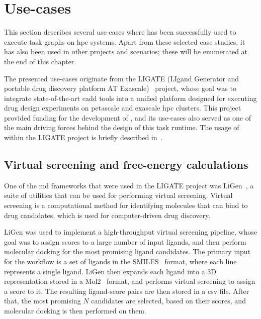 
\section{Use-cases}
This section describes several use-cases where \hyperqueue{} has been successfully used
to execute task graphs on \gls{hpc} systems. Apart from these selected case studies,
it has also been used in other projects and scenarios; these will be enumerated at the end of this
chapter.

The presented use-cases originate from the LIGATE (LIgand Generator and portable drug discovery
platform AT Exascale)~\cite{ligate} project, whose goal was to integrate state-of-the-art
\gls{cadd} tools into a unified platform designed for executing drug design
experiments on petascale and exascale \gls{hpc} clusters. This project provided
funding for the development of \hyperqueue{}, and its use-cases also served as one of the
main driving forces behind the design of this task runtime. The usage of \hyperqueue{}
within the LIGATE project is briefly described in~\cite{ligate}.

\subsection{Virtual screening and free-energy calculations}
\label{sec:hq-usecase-ligen}
One of the \gls{md} frameworks that were used in the LIGATE project was
LiGen~\cite{ligen,ligen_exscalate}, a suite of utilities that can be used for performing virtual
screening. Virtual screening is a computational method for identifying molecules that can bind to
drug candidates, which is used for computer-driven drug discovery.

LiGen was used to implement a high-throughput virtual screening pipeline, whose goal was to assign
scores to a large number of input ligands, and then perform molecular docking for the most
promising ligand candidates. The primary input for the workflow is a set of ligands in the
SMILES~\cite{smiles} format, where each line represents a single ligand. LiGen then
expands each ligand into a 3D representation stored in a Mol2~\cite{mol2} format, and
performs virtual screening to assign a score to it. The resulting ligand-score pairs are then
stored in a \gls{csv} file. After that, the most promising $N$
candidates are selected, based on their scores, and molecular docking is then performed on them.

